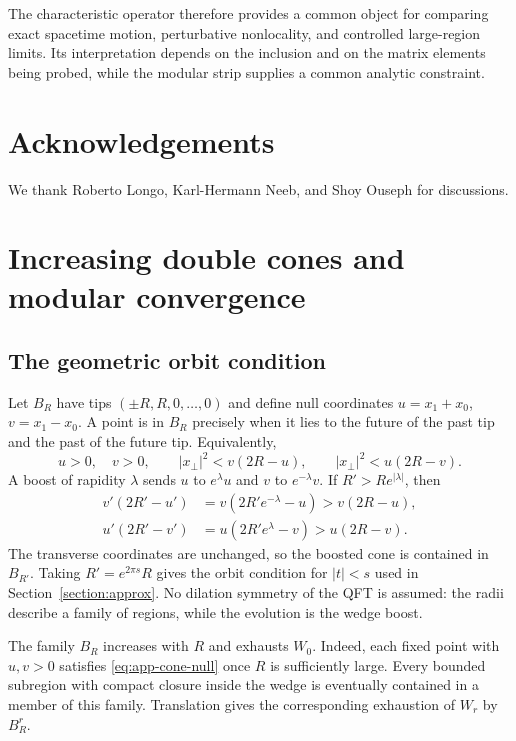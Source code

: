 \documentclass[a4paper,11pt]{article}
\theoremstyle{definition}
\begin{document}
The characteristic operator therefore provides a common object for comparing
exact spacetime motion, perturbative nonlocality, and controlled large-region
limits. Its interpretation depends on the inclusion and on the matrix elements
being probed, while the modular strip supplies a common analytic constraint.

\section*{Acknowledgements}
We thank Roberto Longo, Karl-Hermann Neeb, and Shoy Ouseph for discussions.

\appendix
\section{Increasing double cones and modular convergence}\label{app:exhaustion}

\subsection{The geometric orbit condition}

Let $B_R$ have tips $(\pm R,R,0,\ldots,0)$ and define null coordinates
$u=x_1+x_0$, $v=x_1-x_0$. A point is in $B_R$ precisely when it lies to the
future of the past tip and the past of the future tip. Equivalently,
\begin{equation}
 u>0,\quad v>0,\qquad
 |x_\perp|^2<v(2R-u),\qquad
 |x_\perp|^2<u(2R-v).
 \label{eq:app-cone-null}
\end{equation}
A boost of rapidity $\lambda$ sends $u$ to $e^\lambda u$ and $v$ to
$e^{-\lambda}v$. If $R'>Re^{|\lambda|}$, then
\begin{align}
 v'(2R'-u')&=v(2R'e^{-\lambda}-u)>v(2R-u),\nonumber\\
 u'(2R'-v')&=u(2R'e^{\lambda}-v)>u(2R-v).
\end{align}
The transverse coordinates are unchanged, so the boosted cone is contained in
$B_{R'}$. Taking $R'=e^{2\pi s}R$ gives the orbit condition for $|t|<s$ used
in Section~\ref{section:approx}. No dilation symmetry of the QFT is assumed:
the radii describe a family of regions, while the evolution is the wedge boost.

The family $B_R$ increases with $R$ and exhausts $W_0$. Indeed, each fixed point
with $u,v>0$ satisfies \eqref{eq:app-cone-null} once $R$ is sufficiently large.
Every bounded subregion with compact closure inside the wedge is eventually
contained in a member of this family. Translation gives the corresponding
exhaustion of $W_r$ by $B_R^r$.
\end{document}
